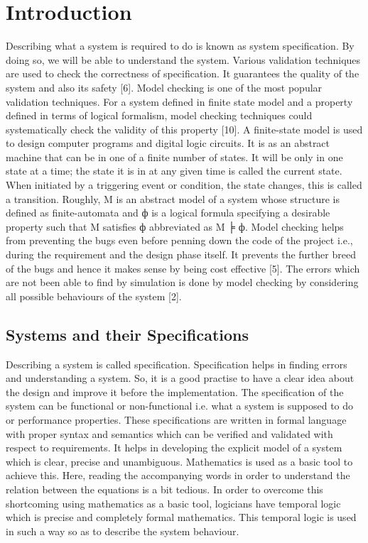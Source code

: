 \documentclass{article}
\begin{document}
\section{Introduction}
Describing what a system is required to do is known as system specification. By doing so, we will be able to understand the system. Various validation techniques are used to check the correctness of specification. It guarantees the quality of the system and also its safety [6]. Model checking is one of the most popular validation techniques. For a system defined in finite state model and a property defined in terms of logical formalism, model checking techniques could systematically check the validity of this property [10]. A finite-state model is used to design computer programs and digital logic circuits. It is as an abstract machine that can be in one of a finite number of states. It will be only in one state at a time; the state it is in at any given time is called the current state. When initiated by a triggering event or condition, the state changes, this is called a transition. 
Roughly, M is an abstract model of a system whose structure is defined as finite-automata and ф is a logical formula specifying a desirable property such that M satisfies ф abbreviated as M ╞ ф. 
Model checking helps from preventing the bugs even before penning down the code of the project i.e., during the requirement and the design phase itself. It prevents the further breed of the bugs and hence it makes sense by being cost effective [5]. The errors which are not been able to find by simulation is done by model checking by considering all possible behaviours of the system [2].  
\subsection{Systems and their Specifications}
Describing a system is called specification. Specification helps in finding errors and    understanding a system. So, it is a good practise to have a clear idea about the design and improve it before the implementation. The specification of the system can be functional or non-functional i.e. what a system is supposed to do or performance properties. These specifications are written in formal language with proper syntax and semantics which can be verified and validated with respect to requirements. 
It helps in developing the explicit model of a system which is clear, precise and unambiguous. Mathematics is used as a basic tool to achieve this. Here, reading the accompanying words in order to understand the relation between the equations is a bit tedious. In order to overcome this shortcoming using mathematics as a basic tool, logicians have temporal logic which is precise and completely formal mathematics. This temporal logic is used in such a way so as to describe the system behaviour.  
\end{document}
